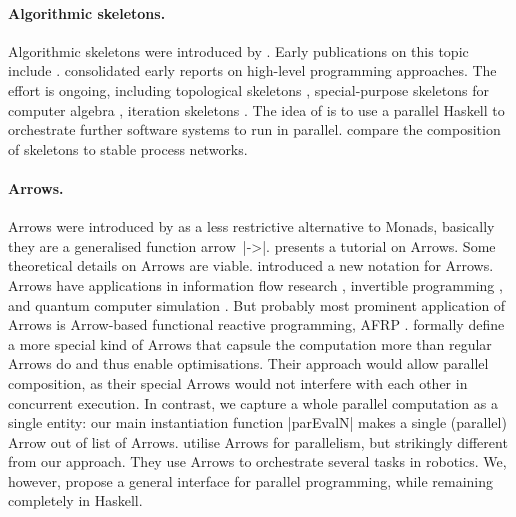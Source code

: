 \paragraph{Algorithmic skeletons.}
Algorithmic skeletons were introduced by \citet{Cole1989}.
Early publications on this topic include \cite{darlington1993parallel,botorog1996efficient,p3l97,Gorlatch1998,Lengauer1997}. \citet{SkeletonBook} consolidated early reports on high-level programming approaches.
The effort is ongoing, including topological skeletons \cite{Eden:PARCO05}, special-purpose skeletons for computer algebra \cite{Berthold2009-fft,lobachev-phd,Lobachev2012,janjic2013space}, iteration skeletons \cite{Dieterle2013}. The idea of \citet{scscp} is to use a parallel Haskell to orchestrate further software systems to run in parallel. \citet{dieterle_horstmeyer_loogen_berthold_2016} compare the composition of skeletons to stable process networks.

\paragraph{Arrows.}
Arrows were introduced by \citet{HughesArrows} as a less restrictive alternative to Monads, basically they are a generalised function arrow~|->|. \citet{Hughes2005} presents a tutorial on Arrows. Some theoretical details on Arrows \cite{jacobs_heunen_hasuo_2009,LINDLEY201197,ATKEY201119} are viable. \citet{Paterson:2001:NNA:507669.507664} introduced a new notation for Arrows. Arrows have applications in information flow research \cite{1648705,LI20101974,Russo:2008:LLI:1411286.1411289}, invertible programming \cite{Alimarine:2005:BAA:1088348.1088357}, and quantum computer simulation \cite{vizzotto_altenkirch_sabry_2006}. But probably most prominent application of Arrows is Arrow-based functional reactive programming, AFRP \cite{Nilsson:2002:FRP:581690.581695,Hudak2003,Czaplicki:2013:AFR:2499370.2462161}.
\citet{Liu:2009:CCA:1631687.1596559} formally define a more special kind of Arrows that capsule the computation more than regular Arrows do and thus enable optimisations. Their approach would allow parallel composition, as their special Arrows would not interfere with each other in concurrent execution. In contrast, we capture a whole parallel computation as a single entity: our main instantiation function |parEvalN| makes a single (parallel) Arrow out of list of Arrows. \citet{Huang2007} utilise Arrows for parallelism, but strikingly different from our approach. They use Arrows to orchestrate several tasks in robotics. We, however, propose a general interface for parallel programming, while remaining completely in Haskell.

